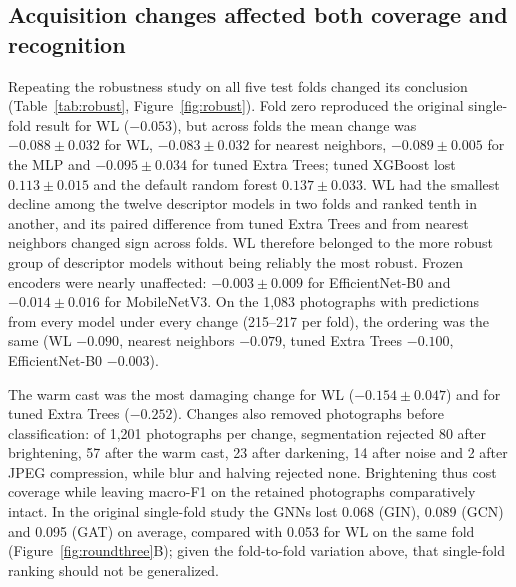 \subsection{Acquisition changes affected both coverage and recognition}
Repeating the robustness study on all five test folds changed its conclusion (Table~\ref{tab:robust}, Figure~\ref{fig:robust}). Fold zero reproduced the original single-fold result for WL ($-0.053$), but across folds the mean change was $-0.088\pm0.032$ for WL, $-0.083\pm0.032$ for nearest neighbors, $-0.089\pm0.005$ for the MLP and $-0.095\pm0.034$ for tuned Extra Trees; tuned XGBoost lost $0.113\pm0.015$ and the default random forest $0.137\pm0.033$. WL had the smallest decline among the twelve descriptor models in two folds and ranked tenth in another, and its paired difference from tuned Extra Trees and from nearest neighbors changed sign across folds. WL therefore belonged to the more robust group of descriptor models without being reliably the most robust. Frozen encoders were nearly unaffected: $-0.003\pm0.009$ for EfficientNet-B0 and $-0.014\pm0.016$ for MobileNetV3. On the 1,083 photographs with predictions from every model under every change (215--217 per fold), the ordering was the same (WL $-0.090$, nearest neighbors $-0.079$, tuned Extra Trees $-0.100$, EfficientNet-B0 $-0.003$).

The warm cast was the most damaging change for WL ($-0.154\pm0.047$) and for tuned Extra Trees ($-0.252$). Changes also removed photographs before classification: of 1,201 photographs per change, segmentation rejected 80 after brightening, 57 after the warm cast, 23 after darkening, 14 after noise and 2 after JPEG compression, while blur and halving rejected none. Brightening thus cost coverage while leaving macro-F1 on the retained photographs comparatively intact. In the original single-fold study the GNNs lost 0.068 (GIN), 0.089 (GCN) and 0.095 (GAT) on average, compared with 0.053 for WL on the same fold (Figure~\ref{fig:roundthree}B); given the fold-to-fold variation above, that single-fold ranking should not be generalized.
\showpanel{\robusttable}
\showpanel{\robustpanel}

